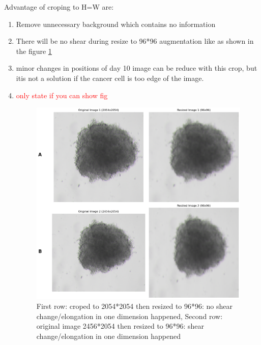 \begin{enumerate}
    Advantage of croping to H=W are:
    \begin{enumerate}
      \item  Remove unnecessary background which contains no information
      \item  There will be no shear during resize to 96*96 augmentation like as shown in the figure \ref{fig:elong}
      \item minor changes in positions of day 10 image can be reduce with this crop, but itis not a solution if the cancer cell is too edge of the image.
      \item \textcolor{red}{only state if you can show fig}
      \begin{figure}[H]
        \centering
        \includegraphics[scale=0.46]{figures/long.png} 
        \caption{First row: croped to 2054*2054 then resized to 96*96: no shear change/elongation in one dimension happened, Second row: 
       original image 2456*2054 then resized to 96*96: shear change/elongation in one dimension happened}
        \label{fig:elong}
      \end{figure}
      

\end{enumerate}
\end{enumerate}
